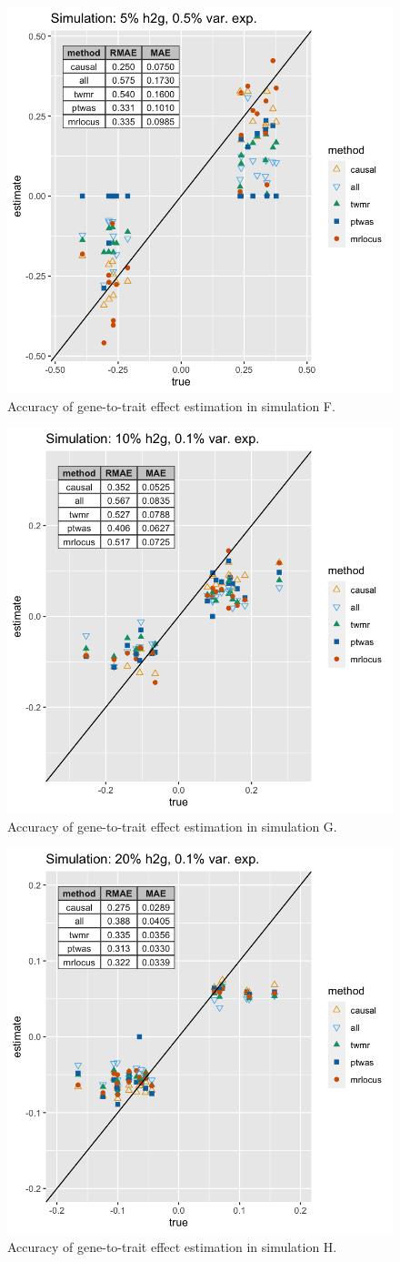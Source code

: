 \documentclass[11pt]{article}
\begin{document}
\begin{figure}[!ht]
  \centering
  \includegraphics[width=.6\textwidth]{figs/sim8.png}
  \caption{Accuracy of gene-to-trait effect estimation in simulation F.}
\end{figure}

\begin{figure}[!ht]
  \centering
  \includegraphics[width=.6\textwidth]{figs/sim5.png}
  \caption{Accuracy of gene-to-trait effect estimation in simulation G.}
\end{figure}

\begin{figure}[!ht]
  \centering
  \includegraphics[width=.6\textwidth]{figs/sim7.png}
  \caption{Accuracy of gene-to-trait effect estimation in simulation H.}
\end{figure}
\end{document}
